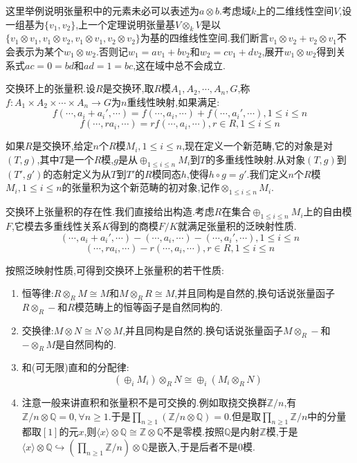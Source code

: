 这里举例说明张量积中的元素未必可以表述为$a\otimes b$.考虑域$k$上的二维线性空间$V$,设一组基为$\{v_1,v_2\}$,上一个定理说明张量基$V\otimes_kV$是以$\{v_1\otimes v_1,v_1\otimes v_2,v_1\otimes v_1,v_2\otimes v_2\}$为基的四维线性空间.我们断言$v_1\otimes v_2+v_2\otimes v_1$不会表示为某个$w_1\otimes w_2$.否则记$w_1=av_1+bv_2$和$w_2=cv_1+dv_2$,展开$w_1\otimes w_2$得到关系式$ac=0=bd$和$ad=1=bc$,这在域中总不会成立.

交换环上的张量积.设$R$是交换环,取$R$模$A_1,A_2,\cdots,A_n,G$,称$f:A_1\times A_2\times\cdots\times A_n\to G$为$n$重线性映射,如果满足:
$$f(\cdots,a_i+a_i',\cdots)=f(\cdots,a_i,\cdots)+f(\cdots,a_i',\cdots),1\le i\le n$$
$$f(\cdots,ra_i,\cdots)=rf(\cdots,a_i,\cdots),r\in R,1\le i\le n$$

如果$R$是交换环,给定$n$个$R$模$M_i,1\le i\le n$,现在定义一个新范畴,它的对象是对$(T,g)$,其中$T$是一个$R$模,$g$是从$\oplus_{1\le i\le n}M_i$到$T$的多重线性映射.从对象$(T,g)$到$(T',g')$的态射定义为从$T$到$T'$的$R$模同态$h$,使得$h\circ g=g'$.我们定义$n$个$R$模$M_i,1\le i\le n$的张量积为这个新范畴的初对象,记作$\otimes_{1\le i\le n}M_i$.

交换环上张量积的存在性.我们直接给出构造.考虑$R$在集合$\oplus_{1\le i\le n} M_i$上的自由模$F$,它模去多重线性关系$K$得到的商模$F/K$就满足张量积的泛映射性质.
$$(\cdots,a_i+a_i',\cdots)-(\cdots,a_i,\cdots)-(\cdots,a_i',\cdots),1\le i\le n$$
$$(\cdots,ra_i,\cdots)-r(\cdots,a_i,\cdots),r\in R,1\le i\le n$$

按照泛映射性质,可得到交换环上张量积的若干性质:
\begin{enumerate}
	\item 恒等律:$R\otimes_RM\cong M$和$M\otimes_RR\cong M$,并且同构是自然的,换句话说张量函子$R\otimes_R-$和$R$模范畴上的恒等函子是自然同构的.
	\item 交换律:$M\otimes N\cong N\otimes M$,并且同构是自然的.换句话说张量函子$M\otimes_R-$和$-\otimes_RM$是自然同构的.
	\item 和(可无限)直和的分配律:
	$$\left(\oplus_iM_i\right)\otimes_R N\cong\oplus_i\left(M_i\otimes_R N\right)$$
	\item 注意一般来讲直积和张量积不是可交换的.例如取挠交换群$\mathbb{Z}/n$,有$\mathbb{Z}/n\otimes\mathbb{Q}={0},\forall n\ge1$.于是$\prod_{n\ge1}(\mathbb{Z}/n\otimes\mathbb{Q})={0}$.但是取$\prod_{n\ge1}\mathbb{Z}/n$中的分量都取$[1]$的元$x$,则$\langle x\rangle\otimes\mathbb{Q}\cong\mathbb{Z}\otimes\mathbb{Q}$不是零模.按照$\mathbb{Q}$是内射$\mathbb{Z}$模,于是$\langle x\rangle\otimes\mathbb{Q}\hookrightarrow(\prod_{n\ge1}\mathbb{Z}/n)\otimes\mathbb{Q}$是嵌入,于是后者不是0模.
\end{enumerate}

